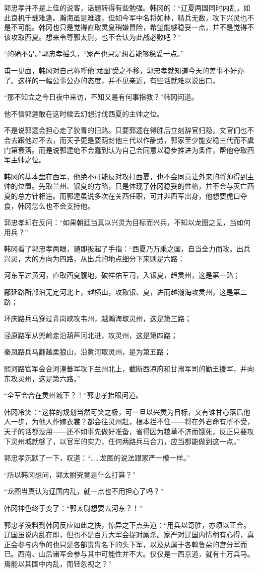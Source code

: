 郭忠孝并不是上佳的说客，话题转得有些勉强。韩冈的：“辽夏两国同时内乱，如此良机千载难逢。瀚海虽是难渡，但如今军中名将如林，精兵无数，攻下兴灵也不是不可能。韩冈也只是觉得直取灵夏稍嫌冒险，希望能够稳妥一点，并不是觉得不该攻取西夏。想来令尊郭太尉，也不会认为此战必败吧？”

“的确不是。”郭忠孝摇头，“家严也只是想着能够稳妥一点。”

甫一见面，韩冈对自己称呼他‘龙图’受之不移，郭忠孝就知道今天的差事不好办了。这样的一幅公事公办的态度，并不见亲近，有些话就难以说出口。

“那不知立之今日夜中来访，不知又是有何事指教？”韩冈问道。

他不信郭逵敢在这时候去幻想讨伐西夏的主帅之位。

不是说郭逵会担心走了狄青的旧路。只要郭逵在得胜后立刻辞官归隐，文官们也不会去跟他过不去，而天子更是要荫封他三代以作酬劳，郭家至少能安稳三代而不虞门第衰落。而是说郭逵绝不会蠢到认为自己会同意以稳步推进为条件，帮他夺取西军主帅之位。

韩冈的基本盘在西军，他绝不可能反对攻打西夏，也不会同意让外来的将帅得到主帅的位置。先取兰州、银夏的方略，只是体现了韩冈稳妥的性格，并不会与灭亡西夏的总方针相违。而郭逵虽说多次在关西任职，可并非西军出身，他想要虎口夺食，韩冈怎么也不会支持他。

郭忠孝却在反问：“如果朝廷当真以兴灵为目标而兴兵，不知以龙图之见，当如何用兵？”

韩冈看了郭忠孝两眼，随即扳起了手指：“西夏乃万乘之国，自当全力而攻。出兵兴灵，大的方向为四路，从出兵的地点细分下来则是六路：

河东军过黄河，直取西夏腹地，破祥佑军司，入银夏，趋灵州，这是第一路；

鄜延路所部沿无定河北上，越横山，攻取银、夏，进而越瀚海攻灵州，这是第二路；

环庆路兵马穿过青岗峡攻韦州，越瀚海取灵州，这是第三路；

泾原路军从兜岭走沿葫芦河北进，攻灵州，这是第四路；

秦凤路兵马翻越柔狼山，沿黄河取灵州，是为第五路；

熙河路官军会合河湟蕃军攻下兰州北上，截断西凉府和甘肃军司的勤王援军，并向东攻灵州，这是第六路。”

“全军会合在灵州城下？！”郭忠孝抬眼问道。

韩冈冷笑：“这样的规划当然可笑之极，可一旦以兴灵为目标，又有谁甘心落后他人一步，为他人作嫁衣裳？都会往灵州赶，根本拦不住——将在外君命有所不受，天子的话都没用——还不如事先做好准备，省得因为粮草不济而饿死，反正只要攻下灵州城就够了，以官军的实力，任何两路兵马合力，应当都能做到这一点。”

郭忠孝沉默了一下，叹道：“……龙图的说法跟家严一模一样。”

“所以韩冈想问，郭太尉究竟是什么打算？”

“龙图当真认为辽国内乱，就一点也不用担心了吗？”

韩冈神色终于变了：“郭太尉想要去河东？！”

郭忠孝没料到韩冈反应如此之快，惊异之下点头道：“用兵以奇胜，亦须以正合。辽国虽说内乱在即，但也不是百万大军会捉对厮杀。家严对辽国内情稍有心得，真正会参与内争的也只是各部贵胄名下的头下军，以及从属于各斡鲁朵的宫分军而已。西南、山后诸军会参与其中可能性并不大。仅仅是一西京道，就有十万兵马。焉能以其国中内乱，而轻忽视之？”


